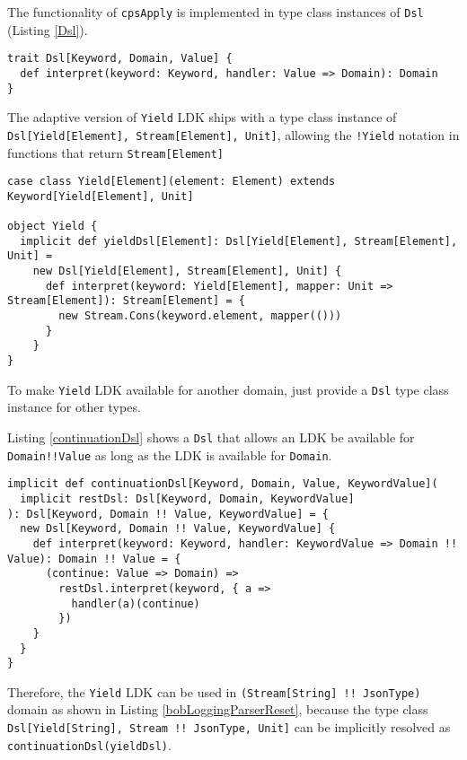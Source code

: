 The functionality of \lstinline{cpsApply} is implemented in type class instances of \lstinline{Dsl} (Listing \ref{Dsl}).

\begin{lstlisting}[caption={The type class to interpret \lstinline{cpsApply}},label={Dsl}]
trait Dsl[Keyword, Domain, Value] {
  def interpret(keyword: Keyword, handler: Value => Domain): Domain
}
\end{lstlisting}

The adaptive version of \lstinline{Yield} LDK ships with a type class instance of \lstinline{Dsl[Yield[Element], Stream[Element], Unit]}, allowing the \lstinline{!Yield} notation in functions that return \lstinline{Stream[Element]}

\begin{lstlisting}[caption={The \lstinline{Yield} LDK, the adaptive version},label={Yield}]
case class Yield[Element](element: Element) extends Keyword[Yield[Element], Unit]

object Yield {
  implicit def yieldDsl[Element]: Dsl[Yield[Element], Stream[Element], Unit] =
    new Dsl[Yield[Element], Stream[Element], Unit] {
      def interpret(keyword: Yield[Element], mapper: Unit => Stream[Element]): Stream[Element] = {
        new Stream.Cons(keyword.element, mapper(()))
      }
    }
}
\end{lstlisting}

To make \lstinline{Yield} LDK available for another domain, just provide a \lstinline{Dsl} type class instance for other types.

Listing \ref{continuationDsl} shows a \lstinline{Dsl} that allows an LDK be available for \lstinline{Domain!!Value} as long as the LDK is available for \lstinline{Domain}.

\begin{lstlisting}[caption={The \lstinline{Yield} LDK, the adaptive version},label={continuationDsl}]
implicit def continuationDsl[Keyword, Domain, Value, KeywordValue](
  implicit restDsl: Dsl[Keyword, Domain, KeywordValue]
): Dsl[Keyword, Domain !! Value, KeywordValue] = {
  new Dsl[Keyword, Domain !! Value, KeywordValue] {
    def interpret(keyword: Keyword, handler: KeywordValue => Domain !! Value): Domain !! Value = {
      (continue: Value => Domain) =>
        restDsl.interpret(keyword, { a =>
          handler(a)(continue)
        })
    }
  }
}
\end{lstlisting}

Therefore, the \lstinline{Yield} LDK can be used in \lstinline{(Stream[String] !! JsonType)} domain as shown in Listing \ref{bobLoggingParserReset}, because the type class \lstinline{Dsl[Yield[String], Stream !! JsonType, Unit]} can be implicitly resolved as \lstinline{continuationDsl(yieldDsl)}.

